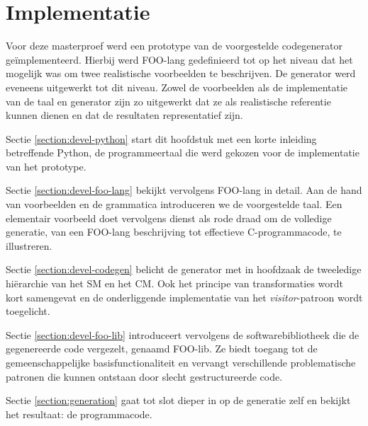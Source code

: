 
\chapter{Implementatie}
\label{chapter:implementatie}

Voor deze masterproef werd een prototype van de voorgestelde codegenerator
ge\"implementeerd. Hierbij werd FOO-lang gedefinieerd tot op het niveau dat het
mogelijk was om twee realistische voorbeelden te beschrijven. De generator werd
eveneens uitgewerkt tot dit niveau. Zowel de voorbeelden als de implementatie
van de taal en generator zijn zo uitgewerkt dat ze als realistische referentie
kunnen dienen en dat de resultaten representatief zijn.

Sectie \ref{section:devel-python} start dit hoofdstuk met een korte inleiding
betreffende Python, de programmeertaal die werd gekozen voor de implementatie
van het prototype.

Sectie \ref{section:devel-foo-lang} bekijkt vervolgens FOO-lang in detail. Aan
de hand van voorbeelden en de grammatica introduceren we de voorgestelde taal.
Een elementair voorbeeld doet vervolgens dienst als rode draad om de volledige
generatie, van een FOO-lang beschrijving tot effectieve C-programmacode, te
illustreren.

Sectie \ref{section:devel-codegen} belicht de generator met in hoofdzaak de
tweeledige hi\"erarchie van het SM en het CM. Ook het principe van
transformaties wordt kort samengevat en de onderliggende implementatie van het
\emph{visitor}-patroon \citep{gamma1994design} wordt toegelicht.

Sectie \ref{section:devel-foo-lib} introduceert vervolgens de
softwarebibliotheek die de gegenereerde code vergezelt, genaamd FOO-lib. Ze
biedt toegang tot de gemeenschappelijke basisfunctionaliteit en vervangt
verschillende problematische patronen die kunnen ontstaan door slecht
gestructureerde code.

Sectie \ref{section:generation} gaat tot slot dieper in op de generatie zelf en
bekijkt het resultaat: de programmacode. 






